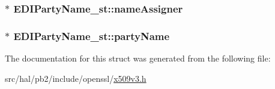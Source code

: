 \subsubsection[{\texorpdfstring{name\+Assigner}{nameAssigner}}]{$\ast$ E\+D\+I\+Party\+Name\+\_\+st\+::name\+Assigner}\hypertarget{struct_e_d_i_party_name__st_a433a2feeea84e1856f17d0aaba7479fa}{}\label{struct_e_d_i_party_name__st_a433a2feeea84e1856f17d0aaba7479fa}
\subsubsection[{\texorpdfstring{party\+Name}{partyName}}]{$\ast$ E\+D\+I\+Party\+Name\+\_\+st\+::party\+Name}\hypertarget{struct_e_d_i_party_name__st_ae0f4115f0794169a894b8a6e01539e50}{}\label{struct_e_d_i_party_name__st_ae0f4115f0794169a894b8a6e01539e50}


The documentation for this struct was generated from the following file\+:\begin{DoxyCompactItemize}
\item 
src/hal/pb2/include/openssl/\hyperlink{x509v3_8h}{x509v3.\+h}\end{DoxyCompactItemize}
